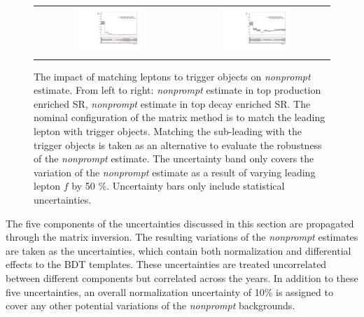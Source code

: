 \begin{figure}[tbh!]
 \begin{center}
 \begin{tabular}{cc}
 \includegraphics[width=0.47\textwidth]{figures/Part3/Systematics/BDT_ST_MM}&
 \includegraphics[width=0.47\textwidth]{figures/Part3/Systematics/BDT_TT_MM} \\
 \end{tabular}
 \caption{The impact of matching leptons to trigger objects on \emph{nonprompt} estimate. From left to right: \emph{nonprompt} estimate in top production enriched \ac{SR}, \emph{nonprompt} estimate in top decay enriched \ac{SR}. The nominal configuration of the matrix method is to match the leading lepton with trigger objects. Matching the sub-leading with the trigger objects is taken as an alternative to evaluate the robustness of the \emph{nonprompt} estimate. The uncertainty band only covers the variation of the \emph{nonprompt} estimate as a result of varying leading lepton $f$ by 50 $\%$. Uncertainty bars only include statistical uncertainties.}
 \label{fig:MM_trigger}
 \end{center}
\end{figure}

The five components of the uncertainties discussed in this section are propagated through the matrix inversion. The resulting variations of the \emph{nonprompt} estimates are taken as the uncertainties, which contain both normalization and differential effects to the BDT templates. These uncertainties are treated uncorrelated between different components but correlated across the years. In addition to these five uncertainties, an overall normalization uncertainty of 10$\%$ is assigned to cover any other potential variations of the \emph{nonprompt} backgrounds.

